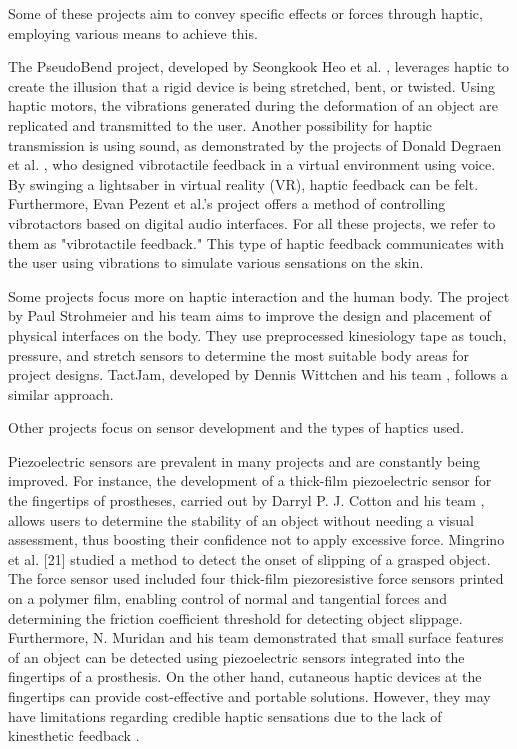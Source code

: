 Some of these projects aim to convey specific effects or forces through haptic, employing various means to achieve this.

The PseudoBend project, developed by Seongkook Heo et al. \cite{heo_pseudobend_2019}, leverages haptic to create the illusion that a rigid device is being stretched, bent, or twisted. Using haptic motors, the vibrations generated during the deformation of an object are replicated and transmitted to the user. Another possibility for haptic transmission is using sound, as demonstrated by the projects of Donald Degraen et al. \cite{degraen_weirding_2021}, who designed vibrotactile feedback in a virtual environment using voice. By swinging a lightsaber in virtual reality (VR), haptic feedback can be felt. Furthermore, Evan Pezent et al.'s project \cite{noauthor_syntacts_nodate} offers a method of controlling vibrotactors based on digital audio interfaces. For all these projects, we refer to them as "vibrotactile feedback." This type of haptic feedback communicates with the user using vibrations to simulate various sensations on the skin.

Some projects focus more on haptic interaction and the human body. The project by Paul Strohmeier and his team \cite{strohmeier_sketching_2020} aims to improve the design and placement of physical interfaces on the body. They use preprocessed kinesiology tape as touch, pressure, and stretch sensors to determine the most suitable body areas for project designs. TactJam, developed by Dennis Wittchen and his team \cite{wittchen_tactjam_2022}, follows a similar approach.

Other projects focus on sensor development and the types of haptics used.

Piezoelectric sensors are prevalent in many projects and are constantly being improved. For instance, the development of a thick-film piezoelectric sensor for the fingertips of prostheses, carried out by Darryl P. J. Cotton and his team \cite{noauthor_novel_nodate}, allows users to determine the stability of an object without needing a visual assessment, thus boosting their confidence not to apply excessive force. Mingrino et al. [21] studied a method to detect the onset of slipping of a grasped object. The force sensor used included four thick-film piezoresistive force sensors printed on a polymer film, enabling control of normal and tangential forces and determining the friction coefficient threshold for detecting object slippage. Furthermore, N. Muridan and his team \cite{muridan_texture_2010} demonstrated that small surface features of an object can be detected using piezoelectric sensors integrated into the fingertips of a prosthesis. On the other hand, cutaneous haptic devices at the fingertips can provide cost-effective and portable solutions. However, they may have limitations regarding credible haptic sensations due to the lack of kinesthetic feedback \cite{minamizawa_simplified_2010}.

